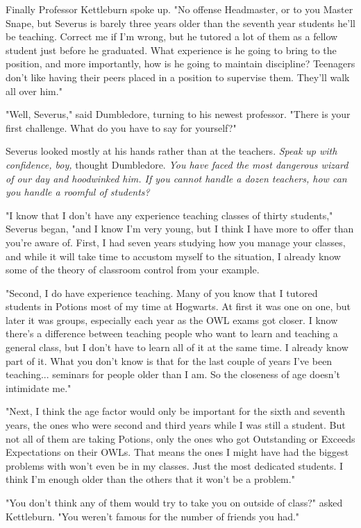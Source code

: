 Finally Professor Kettleburn spoke up. "No offense Headmaster, or to you Master Snape, but Severus is barely three years older than the seventh year students he'll be teaching. Correct me if I'm wrong, but he tutored a lot of them as a fellow student just before he graduated. What experience is he going to bring to the position, and more importantly, how is he going to maintain discipline? Teenagers don't like having their peers placed in a position to supervise them. They'll walk all over him."

"Well, Severus," said Dumbledore, turning to his newest professor. "There is your first challenge. What do you have to say for yourself?"

Severus looked mostly at his hands rather than at the teachers. \emph{Speak up with confidence, boy,} thought Dumbledore. \emph{You have faced the most dangerous wizard of our day and hoodwinked him. If you cannot handle a dozen teachers, how can you handle a roomful of students?}

"I know that I don't have any experience teaching classes of thirty students," Severus began, "and I know I'm very young, but I think I have more to offer than you're aware of. First, I had seven years studying how you manage your classes, and while it will take time to accustom myself to the situation, I already know some of the theory of classroom control from your example.

"Second, I do have experience teaching. Many of you know that I tutored students in Potions most of my time at Hogwarts. At first it was one on one, but later it was groups, especially each year as the OWL exams got closer. I know there's a difference between teaching people who want to learn and teaching a general class, but I don't have to learn all of it at the same time. I already know part of it. What you don't know is that for the last couple of years I've been teaching... seminars for people older than I am. So the closeness of age doesn't intimidate me."

"Next, I think the age factor would only be important for the sixth and seventh years, the ones who were second and third years while I was still a student. But not all of them are taking Potions, only the ones who got Outstanding or Exceeds Expectations on their OWLs. That means the ones I might have had the biggest problems with won't even be in my classes. Just the most dedicated students. I think I'm enough older than the others that it won't be a problem."

"You don't think any of them would try to take you on outside of class?" asked Kettleburn. "You weren't famous for the number of friends you had."

